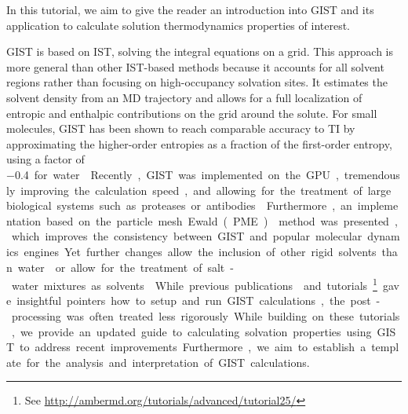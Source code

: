 \documentclass[9pt,tutorial]{livecoms}
\begin{document}
In this tutorial, we aim to give the reader an introduction into GIST and its application to calculate solution thermodynamics properties of interest. 

GIST is based on IST, solving the integral equations on a grid. 
This approach is more general than other IST-based methods because it accounts for all solvent regions rather than focusing on high-occupancy solvation sites.
It estimates the solvent density from an MD trajectory and allows for a full localization of entropic and enthalpic contributions on the grid around the solute.
For small molecules, GIST has been shown to reach comparable accuracy to TI by approximating the higher-order entropies as a fraction of the first-order entropy, using a factor of \SI{-0.4} for water \cite{Chen2021,Waibl2022-gist-solvents}.

Recently, GIST was implemented on the GPU, tremendously improving the calculation speed, and allowing for the treatment of large biological systems such as proteases or antibodies \cite{Kraml2019-gigist}.
Furthermore, an implementation based on the particle mesh Ewald (PME) \cite{Darden1993-pme} method was presented, which improves the consistency between GIST and popular molecular dynamics engines. 
Yet further changes allow the inclusion of other rigid solvents than water \cite{Kraml2020,Waibl2022-gist-solvents} or 
allow for the treatment of salt-water mixtures as solvents \cite{Waibl2021-gist-salt}.

While previous publications \cite{Ramsey2016} and tutorials\footnote{See \url{http://ambermd.org/tutorials/advanced/tutorial25/}} gave insightful pointers how to setup and run GIST calculations, the post-processing was often treated less rigorously. While building on these tutorials, we provide an updated guide to calculating solvation properties using GIST to address recent improvements.
Furthermore, we aim to establish a template for the analysis and interpretation of GIST calculations.
\end{document}

